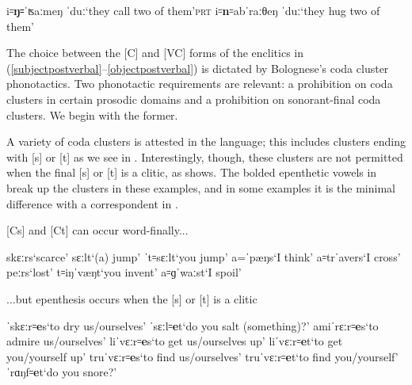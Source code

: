 \documentclass[output=paper,colorlinks,citecolor=brown]{langscibook}
\begin{document}
\begin{exe}
\begin{xlist}
                    \ex 
                        \begin{xlisti}
                            \ex i꞊\textbf{ŋ꞊}ˈʦaːmeŋ ˈduː\tab `they call two of them'\tab \textsc{prt}
                            \ex i꞊\textbf{n}꞊abˈraːθeŋ ˈduː\tab `they hug two of them'
                        \end{xlisti}
			\end{xlist}
\end{exe}


The choice between the [C] and [VC] forms of the enclitics in (\ref{subjectpostverbal}--\ref{objectpostverbal}) is dictated by Bolognese's coda cluster phonotactics.  Two phonotactic requirements are relevant: a prohibition on coda clusters in certain prosodic domains and a prohibition on sonorant-final coda clusters.  We begin with the former.

A variety of coda clusters is attested in the language; this includes clusters ending with [s] or [t] as we see in .  Interestingly, though, these clusters are not permitted when the final [s] or [t] is a clitic, as  shows.  The bolded epenthetic vowels in  break up the clusters in these examples, and in some examples it is the minimal difference with a correspondent in .

\begin{exe}
    \ex \label{wordInternalstclusters} [Cs] and [Ct] can occur word-finally...
        \begin{xlist}
            \ex skɛːrs\tab `scarce'
            \ex sɛːlt\tab `(a) jump'
            \ex ˈt꞊sɛːlt\tab `you jump'
            \ex a=ˈpæŋs\tab `I think'
            \ex a꞊trˈavers\tab `I cross'
            \ex peːrs\tab `lost'
            \ex t꞊iŋˈvæŋt\tab `you invent'
            \ex a꞊ɡˈwaːst\tab `I spoil'
        \end{xlist}
\end{exe}

\begin{exe}
    \ex \label{epenthesiswithclitics} ...but epenthesis occurs when the [s] or [t] is a clitic
        \begin{xlist}
            \ex ˈskɛːr꞊\textbf{e}s\tab `to dry us/ourselves'
            \ex ˈsɛːl꞊\textbf{e}t\tab `do you salt (something)?'
            \ex amiˈrɛːr꞊\textbf{e}s\tab `to admire us/ourselves'
            \ex liˈvɛːr꞊\textbf{e}s\tab `to get us/ourselves up'
            \ex liˈvɛːr꞊\textbf{e}t\tab `to get you/yourself up'
            \ex truˈvɛːr꞊\textbf{e}s\tab `to find us/ourselves'
            \ex truˈvɛːr꞊\textbf{e}t\tab `to find you/yourself'
            \ex ˈrɑŋf꞊\textbf{e}t\tab `do you snore?'
        \end{xlist}
\end{exe}
\end{document}
